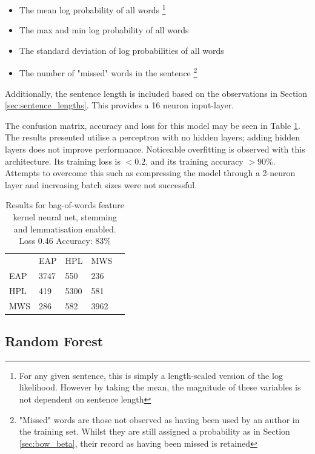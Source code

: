   \begin{itemize}
  \item The mean log probability of all words \footnote{For any given sentence, this is simply a length-scaled version of the log likelihood. However by taking the mean, the magnitude of these variables is not dependent on sentence length}
  \item The max and min log probability of all words
  \item The standard deviation of log probabilities of all words
  \item The number of "missed" words in the sentence \footnote{"Missed" words are those not observed as having been used by an author in the training set. Whilst they are still assigned a probability as in Section \ref{sec:bow_beta}, their record as having been missed is retained}
  \end{itemize}
  
 Additionally, the sentence length is included based on the observations in Section \ref{sec:sentence_lengths}. This provides a 16 neuron input-layer.
 
 The confusion matrix, accuracy and loss for this model may be seen in Table \ref{tab:bow_nn_res}. The results presented utilise a perceptron with no hidden layers; adding hidden layers does not improve performance. Noticeable overfitting is observed with this architecture. Its training loss is $<0.2$, and its training accuracy $>90\%$. Attempts to overcome this such as compressing the model through a 2-neuron layer and increasing batch sizes were not successful.
  
\begin{table}[h]
\centering
\begin{tabular}{m{1cm}|m{1cm}|m{1cm}|m{1cm}|m{0cm}}
\multicolumn{1}{m{1cm}}{} & \multicolumn{1}{m{1cm}}{EAP} & \multicolumn{1}{m{1cm}}{HPL} & \multicolumn{1}{m{1cm}}{MWS} &\\[5pt]
\cline{2-4}
EAP & 3747 & 550 & 236 & \\[5pt]
\cline{2-4}
HPL & 419 & 5300 & 581 & \\[5pt]
\cline{2-4}
MWS & 286 & 582 & 3962 & \\[5pt]
\cline{2-4}
\end{tabular}
\caption{Results for bag-of-words feature kernel neural net, stemming and lemmatisation enabled.\\Loss 0.46 Accuracy: 83\% }
\label{tab:bow_nn_res}
\end{table}

  \subsection{Random Forest}
  \label{sec:forest_extension}

